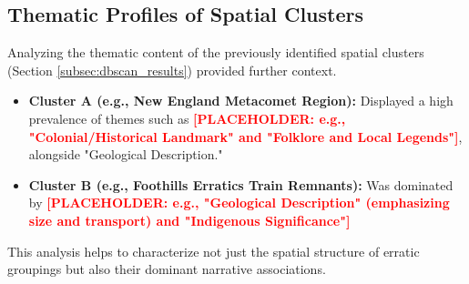 \documentclass[
11pt, %
english, %
singlespacing, %
headsepline, %
]{MastersDoctoralThesis} %
\newcommand{\placeholdertext}[1]{\textcolor{red}{\textbf{[PLACEHOLDER: #1]}}}
\begin{document}
\subsection{Thematic Profiles of Spatial Clusters}
\label{subsec:thematic_profiles_clusters}
Analyzing the thematic content of the previously identified spatial clusters (Section \ref{subsec:dbscan_results}) provided further context.
\begin{itemize}
    \item \textbf{Cluster A (e.g., New England Metacomet Region):} Displayed a high prevalence of themes such as \placeholdertext{e.g., "Colonial/Historical Landmark" and "Folklore and Local Legends"}, alongside "Geological Description."
    \item \textbf{Cluster B (e.g., Foothills Erratics Train Remnants):} Was dominated by \placeholdertext{e.g., "Geological Description" (emphasizing size and transport) and "Indigenous Significance"}
\end{itemize}
This analysis helps to characterize not just the spatial structure of erratic groupings but also their dominant narrative associations.
\end{document}
